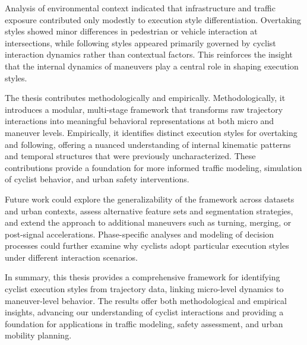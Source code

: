 Analysis of environmental context indicated that infrastructure and traffic exposure contributed only modestly to execution style differentiation. Overtaking styles showed minor differences in pedestrian or vehicle interaction at intersections, while following styles appeared primarily governed by cyclist interaction dynamics rather than contextual factors. This reinforces the insight that the internal dynamics of maneuvers play a central role in shaping execution styles.

The thesis contributes methodologically and empirically. Methodologically, it introduces a modular, multi-stage framework that transforms raw trajectory interactions into meaningful behavioral representations at both micro and maneuver levels. Empirically, it identifies distinct execution styles for overtaking and following, offering a nuanced understanding of internal kinematic patterns and temporal structures that were previously uncharacterized. These contributions provide a foundation for more informed traffic modeling, simulation of cyclist behavior, and urban safety interventions.

Future work could explore the generalizability of the framework across datasets and urban contexts, assess alternative feature sets and segmentation strategies, and extend the approach to additional maneuvers such as turning, merging, or post-signal accelerations. Phase-specific analyses and modeling of decision processes could further examine why cyclists adopt particular execution styles under different interaction scenarios.

In summary, this thesis provides a comprehensive framework for identifying cyclist execution styles from trajectory data, linking micro-level dynamics to maneuver-level behavior. The results offer both methodological and empirical insights, advancing our understanding of cyclist interactions and providing a foundation for applications in traffic modeling, safety assessment, and urban mobility planning.


